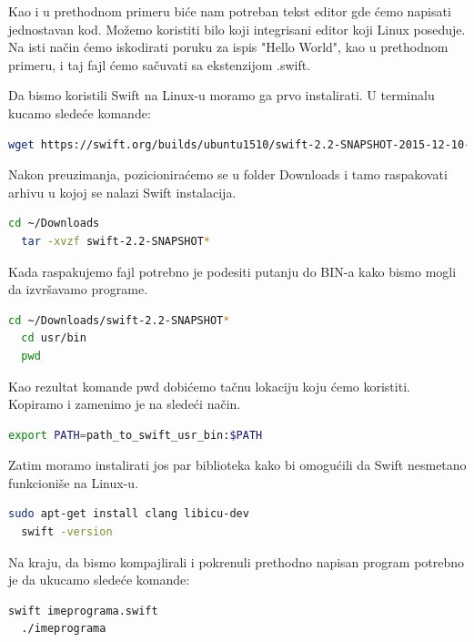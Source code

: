 \documentclass[a4paper]{article}
\begin{document}
Kao i u prethodnom primeru biće nam potreban tekst editor gde ćemo napisati jednostavan kod.
Možemo koristiti bilo koji integrisani editor koji Linux poseduje. Na isti način ćemo iskodirati poruku za ispis "Hello World", kao u prethodnom primeru, i taj fajl ćemo sačuvati sa ekstenzijom .swift.

Da bismo koristili Swift na Linux-u moramo ga prvo instalirati. U terminalu kucamo sledeće komande:

\begin{lstlisting}[language=bash]
	wget https://swift.org/builds/ubuntu1510/swift-2.2-SNAPSHOT-2015-12-10-a/swift-2.2-SNAPSHOT-2015-12-10-a-ubuntu15.10.tar.gz

\end{lstlisting}
Nakon preuzimanja, pozicioniraćemo se u folder Downloads i tamo raspakovati arhivu u kojoj se nalazi Swift instalacija.

\begin{lstlisting}[language=bash]
  cd ~/Downloads
  tar -xvzf swift-2.2-SNAPSHOT*
\end{lstlisting}

Kada raspakujemo fajl potrebno je podesiti putanju do BIN-a kako bismo mogli da izvršavamo programe.

\begin{lstlisting}[language=bash]
  cd ~/Downloads/swift-2.2-SNAPSHOT*
  cd usr/bin
  pwd
\end{lstlisting}

Kao rezultat komande pwd dobićemo tačnu lokaciju koju ćemo koristiti. Kopiramo i zamenimo je na sledeći način.
\begin{lstlisting}[language=bash]
  export PATH=path_to_swift_usr_bin:$PATH

\end{lstlisting}

Zatim moramo instalirati jos par biblioteka kako bi omogućili da Swift nesmetano funkcioniše na Linux-u.

\begin{lstlisting}[language=bash]
  sudo apt-get install clang libicu-dev
  swift -version
\end{lstlisting}

Na kraju, da bismo kompajlirali i pokrenuli prethodno napisan program potrebno je da ukucamo sledeće komande:

\begin{lstlisting}[language=bash]
  swift imeprograma.swift
  ./imeprograma
\end{lstlisting}
\end{document}
